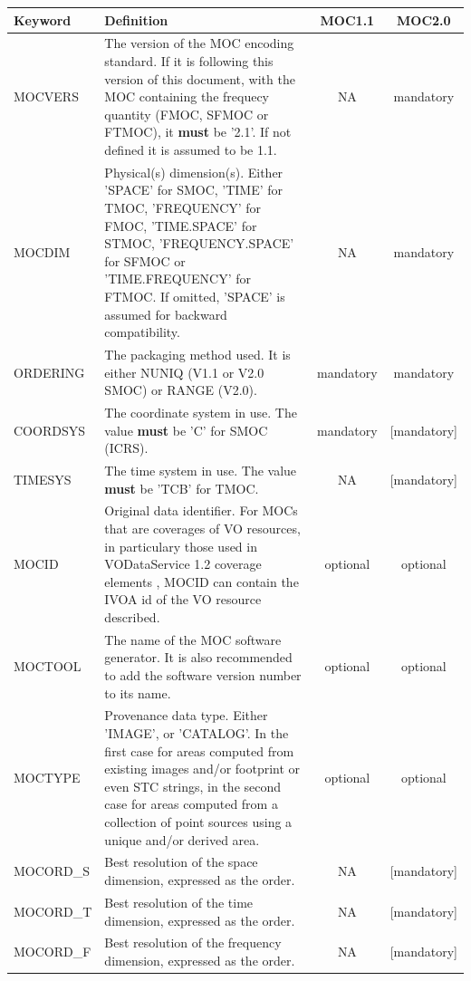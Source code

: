 \begin{table}[!htbp]
\smallskip
\begin{center}
   {\footnotesize
   \begin{tabular} {|l | p{6cm}| c| c|}
   \hline
   {\bf Keyword} & {\bf Definition} & {\bf MOC1.1} & {\bf MOC2.0} \\
   \hline
   MOCVERS  & The version of the MOC encoding standard. If it is following this version of this document, with the MOC containing the frequecy quantity (FMOC, SFMOC or FTMOC), it {\bf must} be '2.1'. If not defined it is assumed to be 1.1. & NA & mandatory \\
   MOCDIM   & Physical(s) dimension(s). Either 'SPACE' for SMOC, 'TIME' for TMOC, 'FREQUENCY' for FMOC, 'TIME.SPACE' for STMOC, 'FREQUENCY.SPACE' for SFMOC or 'TIME.FREQUENCY' for FTMOC. If omitted, 'SPACE' is assumed for backward compatibility. & NA & mandatory \\
   ORDERING & The packaging method used. It is either NUNIQ (V1.1 or V2.0 SMOC) or RANGE (V2.0). & mandatory & mandatory \\
   COORDSYS & The coordinate system in use. The value {\bf must} be 'C' for SMOC (ICRS). & mandatory & [mandatory]  \\
   TIMESYS  &  The time system in use. The value {\bf must} be 'TCB' for TMOC.  & NA & [mandatory] \\
   MOCID    & Original data identifier. For MOCs that are coverages of VO resources, in particulary those used in VODataService 1.2 coverage elements \citep{2021ivoa.spec.1102D}, MOCID can contain the IVOA id of the VO resource described. & optional & optional \\
   MOCTOOL  & The name of the MOC software generator. It is also recommended to add the software version number to its name. & optional & optional \\
   MOCTYPE  & Provenance data type. Either 'IMAGE', or 'CATALOG'. In the first case for areas computed from existing images and/or footprint or even STC strings, in the second case for areas computed from a collection of point sources using a unique and/or derived area. & optional & optional \\
   MOCORD\_S  & Best resolution of the space dimension, expressed as the order. & NA & [mandatory]\\
   MOCORD\_T  & Best resolution of the time dimension, expressed as the order. & NA & [mandatory] \\
   MOCORD\_F  & Best resolution of the frequency dimension, expressed as the order. & NA & [mandatory] \\

\end{tabular}}
\end{center}
\end{table}
